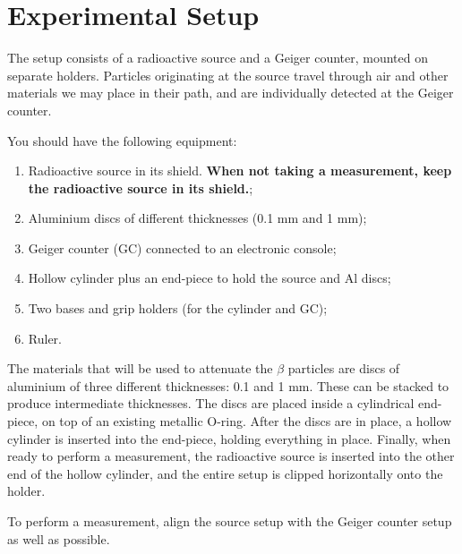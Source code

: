 \section{Experimental Setup}

The setup consists of a radioactive source and a Geiger counter, mounted on separate holders. Particles originating at the source travel through air and other materials we may place in their path, and are individually detected at the Geiger counter.

You should have the following equipment:
\begin{enumerate}
\item{Radioactive source in its shield. \textbf{When not taking a measurement, keep the radioactive source in its shield.};}
\item{Aluminium discs of different thicknesses (0.1 mm and 1 mm);}
\item{Geiger counter (GC) connected to an electronic console;}
\item{Hollow cylinder plus an end-piece to hold the source and Al discs;}
\item{Two bases and grip holders (for the cylinder and GC);}
\item{Ruler.}
\end{enumerate}

The materials that will be used to attenuate the $\beta$ particles are discs of aluminium of three different thicknesses: 0.1 and 1 mm. These can be stacked to produce intermediate thicknesses. The discs are placed inside a cylindrical end-piece, on top of an existing metallic O-ring. After the discs are in place, a hollow cylinder is inserted into the end-piece, holding everything in place. Finally, when ready to perform a measurement, the radioactive source is inserted into the other end of the hollow cylinder, and the entire setup is clipped horizontally onto the holder.

To perform a measurement, align the source setup with the Geiger counter setup as well as possible.